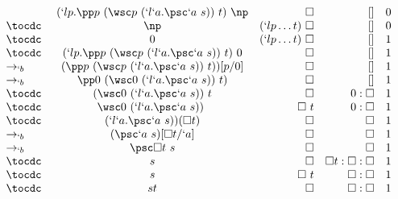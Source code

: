 {
\[
\begin{array}{lcrrr}
         & (`lp.\pp p\ (\wsc p\ (`l`a.\psc `a\ s))\ t)\ \np & \square & []                        & 0 \\
\tocdc\  & \np & (`lp \dots t)\ \square & []                                                      & 0 \\
\tocdc\  & 0 & (`lp \dots t)\ \square & []                                                        & 1 \\
\tocdc\  & (`lp.\pp p\ (\wsc p\ (`l`a.\psc `a\ s))\ t)\ 0 & \square    & []                        & 1 \\
\to_{`b} & (\pp p\ (\wsc p\ (`l`a.\psc `a\ s))\ t))[p/0]  & \square    & []                        & 1 \\
\to_{`b} & \pp 0\ (\wsc 0\ (`l`a.\psc `a\ s))\ t)         & \square    & []                        & 1 \\
\tocdc\  & (\wsc 0\ (`l`a.\psc `a\ s))\ t                 & \square    & 0:\square                 & 1 \\
\tocdc\  & \wsc 0\ (`l`a.\psc `a\ s))\                    & \square\ t & 0:\square                 & 1 \\
\tocdc\  & (`l`a.\psc `a\ s))(\square t)                  & \square    & \square                   & 1 \\
\to_{`b} & (\psc `a\ s)[\square t/`a]                     & \square    & \square                   & 1 \\
\to_{`b} & \psc \square t\ s                              & \square    & \square                   & 1 \\
\tocdc\  & s                                              & \square    & \square t:\square:\square & 1 \\
\tocdc\  & s                                              & \square\ t & \square:\square           & 1 \\
\tocdc\  & st                                             & \square    & \square:\square           & 1 \\
\end{array}
\]
}
